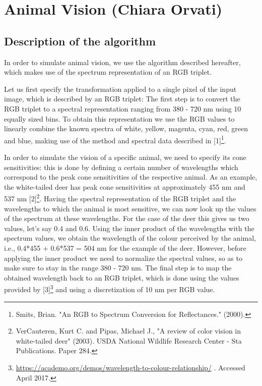 \documentclass[12pt]{article}
\begin{document}
\section{Animal Vision (Chiara Orvati)}

\subsection{Description of the algorithm}

In order to simulate animal vision, we use the algorithm described hereafter, which makes use of the
spectrum representation of an RGB triplet.

\vspace{5mm}

Let us first specify the transformation applied to a single pixel of the input image, which is described by an
RGB triplet: The first step is to convert the RGB triplet to a spectral representation ranging from 380 - 720
nm using 10 equally sized bins. To obtain this representation we use the RGB values to linearly combine the
known spectra of white, yellow, magenta, cyan, red, green and blue, making use of the method and
spectral data described in [1]\footnote{Smits, Brian. "An RGB to Spectrum Conversion for Reflectances." (2000).}.

In order to simulate the vision of a specific animal, we need to specify its cone sensitivities: this is done by
defining a certain number of wavelengths which correspond to the peak cone sensitivities of the respective
animal. As an example, the white-tailed deer has peak cone sensitivities at approximately 455 nm and 537
nm [2]\footnote{VerCauteren, Kurt C. and Pipas, Michael J., "A review of color vision in white-tailed deer" (2003). USDA
National Wildlife Research Center - Sta Publications. Paper 284.}. Having the spectral representation of the RGB triplet and the wavelengths to which the animal is most
sensitive, we can now look up the values of the spectrum at these wavelengths. For the case of the deer
this gives us two values, let’s say 0.4 and 0.6. Using the inner product of the wavelengths with the spectrum
values, we obtain the wavelength of the colour perceived by the animal, i.e., 0.4*455 + 0.6*537 = 504 nm for
the example of the deer. However, before applying the inner product we need to normalize the spectral
values, so as to make sure to stay in the range 380 - 720 nm. The final step is to map the obtained
wavelength back to an RGB triplet, which is done using the values provided by [3]\footnote{\url{https://academo.org/demos/wavelength-to-colour-relationship/} . Accessed April 2017.} and using a discretization
of 10 nm per RGB value.
\end{document}
